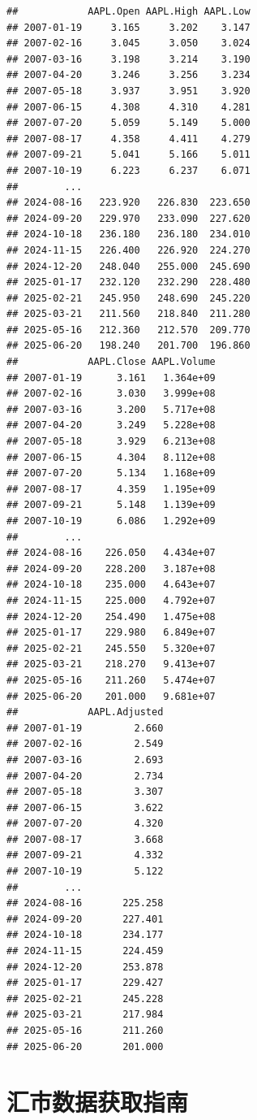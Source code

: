 \documentclass[]{ctexbook}
\begin{document}
\begin{verbatim}
##            AAPL.Open AAPL.High AAPL.Low
## 2007-01-19     3.165     3.202    3.147
## 2007-02-16     3.045     3.050    3.024
## 2007-03-16     3.198     3.214    3.190
## 2007-04-20     3.246     3.256    3.234
## 2007-05-18     3.937     3.951    3.920
## 2007-06-15     4.308     4.310    4.281
## 2007-07-20     5.059     5.149    5.000
## 2007-08-17     4.358     4.411    4.279
## 2007-09-21     5.041     5.166    5.011
## 2007-10-19     6.223     6.237    6.071
##        ...                             
## 2024-08-16   223.920   226.830  223.650
## 2024-09-20   229.970   233.090  227.620
## 2024-10-18   236.180   236.180  234.010
## 2024-11-15   226.400   226.920  224.270
## 2024-12-20   248.040   255.000  245.690
## 2025-01-17   232.120   232.290  228.480
## 2025-02-21   245.950   248.690  245.220
## 2025-03-21   211.560   218.840  211.280
## 2025-05-16   212.360   212.570  209.770
## 2025-06-20   198.240   201.700  196.860
##            AAPL.Close AAPL.Volume
## 2007-01-19      3.161   1.364e+09
## 2007-02-16      3.030   3.999e+08
## 2007-03-16      3.200   5.717e+08
## 2007-04-20      3.249   5.228e+08
## 2007-05-18      3.929   6.213e+08
## 2007-06-15      4.304   8.112e+08
## 2007-07-20      5.134   1.168e+09
## 2007-08-17      4.359   1.195e+09
## 2007-09-21      5.148   1.139e+09
## 2007-10-19      6.086   1.292e+09
##        ...                       
## 2024-08-16    226.050   4.434e+07
## 2024-09-20    228.200   3.187e+08
## 2024-10-18    235.000   4.643e+07
## 2024-11-15    225.000   4.792e+07
## 2024-12-20    254.490   1.475e+08
## 2025-01-17    229.980   6.849e+07
## 2025-02-21    245.550   5.320e+07
## 2025-03-21    218.270   9.413e+07
## 2025-05-16    211.260   5.474e+07
## 2025-06-20    201.000   9.681e+07
##            AAPL.Adjusted
## 2007-01-19         2.660
## 2007-02-16         2.549
## 2007-03-16         2.693
## 2007-04-20         2.734
## 2007-05-18         3.307
## 2007-06-15         3.622
## 2007-07-20         4.320
## 2007-08-17         3.668
## 2007-09-21         4.332
## 2007-10-19         5.122
##        ...              
## 2024-08-16       225.258
## 2024-09-20       227.401
## 2024-10-18       234.177
## 2024-11-15       224.459
## 2024-12-20       253.878
## 2025-01-17       229.427
## 2025-02-21       245.228
## 2025-03-21       217.984
## 2025-05-16       211.260
## 2025-06-20       201.000
\end{verbatim}

\section{汇市数据获取指南}\label{ux6c47ux5e02ux6570ux636eux83b7ux53d6ux6307ux5357}
\end{document}
